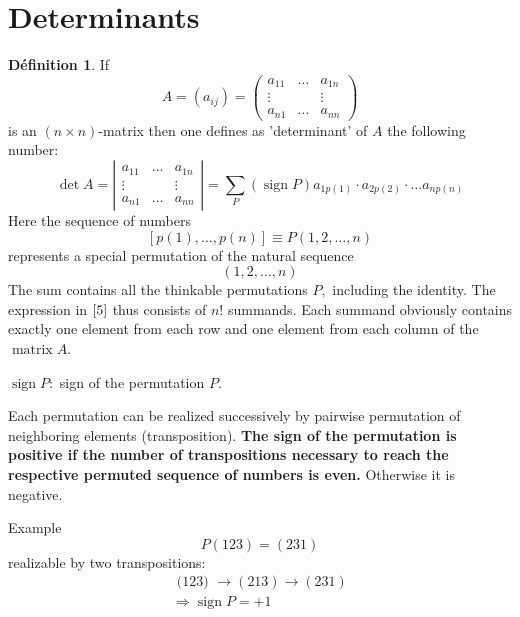 \documentclass[12pt]{book}
\theoremstyle{definition}\newtheorem{dfn}{Définition}[chapter]
\theoremstyle{plain}\newtheorem{thm}{Théorème}[chapter]
\theoremstyle{plain}\newtheorem{prp}{Proposition}[chapter]
\theoremstyle{plain}\newtheorem{lem}{\bf Lemme}[chapter]
\theoremstyle{plain}\newtheorem{axm}{\bf Axiome}[chapter]
\theoremstyle{plain}\newtheorem{lmm}{\bf Lemme}[chapter]
\theoremstyle{plain}\newtheorem{cor}{\bf Corollaire}[chapter]
\theoremstyle{remark}\newtheorem{rem}{Remarque}[chapter]
\begin{document}
\section{Determinants}
\begin{dfn}
If
$$
A=\left(a_{i j}\right)=\left(\begin{array}{ccc}
a_{11} & \ldots & a_{1 n} \\
\vdots & & \vdots \\
a_{n 1} & \ldots & a_{n n}
\end{array}\right)
$$
is an $(n \times n)$-matrix then one defines as 'determinant' of $A$ the following number:
\begin{equation}
\operatorname{det} A=\left|\begin{array}{ccc}
a_{11} & \ldots & a_{1 n} \\
\vdots & & \vdots \\
a_{n 1} & \ldots & a_{n n}
\end{array}\right|=\sum_{P}(\operatorname{sign} P) a_{1 p(1)} \cdot a_{2 p(2)} \cdot \ldots a_{n p(n)}\label{5}
\end{equation}
Here the sequence of numbers
$$
[p(1), \ldots, p(n)] \equiv P(1,2, \ldots, n)
$$
represents a special permutation of the natural sequence
$$
(1,2, \ldots, n)
$$
The sum contains all the thinkable permutations $P,$ including the identity. The expression in $\ref{5}$ thus consists of $n !$ summands. Each summand obviously contains exactly one element from each row and one element from each column of the $\operatorname{matrix} A.$

$\operatorname{sign} P:$ sign of the permutation $P .$

Each permutation can be realized successively by pairwise permutation of neighboring elements (transposition). {\bf The sign of the permutation is positive if the number of transpositions necessary to reach the respective permuted sequence of numbers is even.} Otherwise it is negative.

Example
$$
P(123)=(231)
$$
realizable by two transpositions:
$$
\begin{array}{l}
\text { (123) } \rightarrow(213) \rightarrow(231) \\
\Longrightarrow \operatorname{sign} P=+1
\end{array}
$$
\end{dfn}
\end{document}
